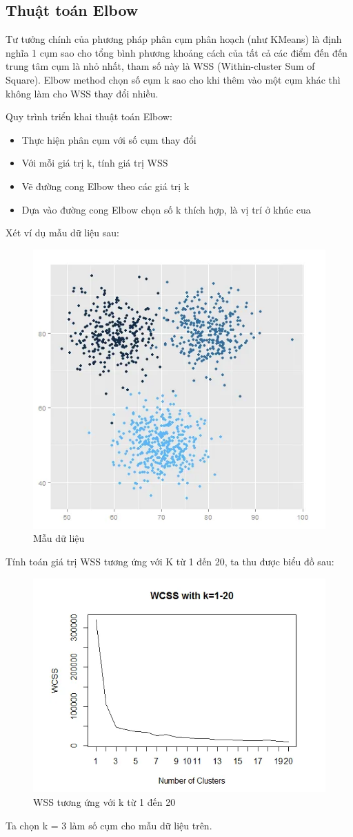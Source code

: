 \documentclass{article}
\begin{document}
	\subsection{Thuật toán Elbow}
	Tư tưởng chính của phương pháp phân cụm phân hoạch (như KMeans) là định nghĩa 1 cụm sao cho tổng bình phương khoảng cách của tất cả các điểm đến đến trung tâm cụm là nhỏ nhất, tham số này là WSS (Within-cluster Sum of Square). Elbow method chọn số cụm k sao cho khi thêm vào  một cụm khác thì không làm cho WSS thay đổi nhiều.\par
	\newpage
	Quy trình triển khai thuật toán Elbow:
	\begin{itemize}
		\item Thực hiện phân cụm với số cụm thay đổi
		\item Với mỗi giá trị k, tính giá trị WSS
		\item Vẽ đường cong Elbow theo các giá trị k
		\item Dựa vào đường cong Elbow chọn số k thích hợp, là vị trí ở khúc cua 
	\end{itemize}
	Xét ví dụ mẫu dữ liệu sau:
	\begin{figure}[h]
		\centering
		\includegraphics[width=0.5\linewidth]{img/data_set_1}
		\caption{Mẫu dữ liệu}
	\end{figure}\par
	Tính toán giá trị WSS tương ứng với K từ 1 đến 20, ta thu được biểu đồ sau:
	\begin{figure}[h]
		\centering
		\includegraphics[width=0.6\linewidth]{img/data_set_2}
		\caption{WSS tương ứng với k từ 1 đến 20}
	\end{figure}\par
	Ta chọn k = 3 làm số cụm cho mẫu dữ liệu trên.
	\newpage
\end{document}

